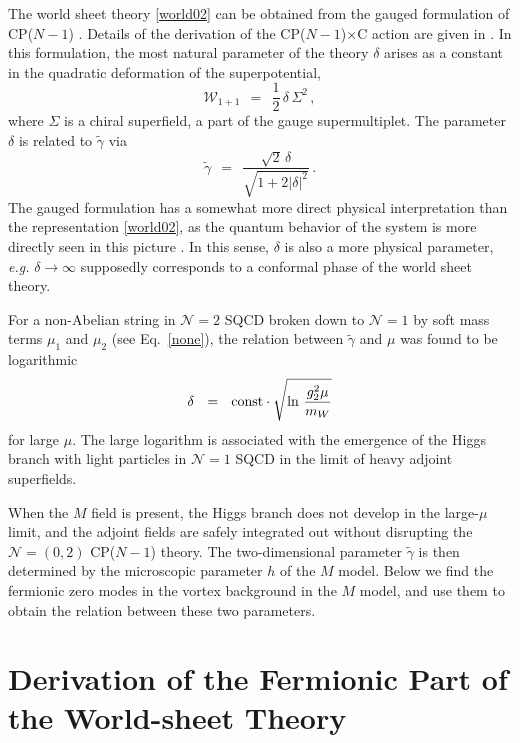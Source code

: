 \documentclass[12pt]{article}
\def\beq{\begin{equation}}
\def\eeq{\end{equation}}
\newcommand{\ntwo}{${\mathcal N}=2$ }
\newcommand{\ntwoo}{${\mathcal N}= \left(0,2\right) $ }
\newcommand{\none}{${\mathcal N}=1$ }
\newcommand{\wt}{\widetilde}
\newcommand{\CPC}{CP($N-1$)$\times$C }
\newcommand{\tgamma}{\wt{\gamma}}
\begin{document}
	The world sheet theory \eqref{world02} can be obtained from the gauged formulation of CP($N-1$) \cite{W93}.
	Details of the derivation of the \CPC action are given in \cite{SYhet,BSYhet}.
	In this formulation, the most natural parameter of the theory $\delta$ arises as 
	a constant in the quadratic deformation of the superpotential,
\[
	\mathcal{W}_{1+1} ~~=~~ \frac{1}{2}\,\delta\,\Sigma^2\,,
\]
	where $\Sigma$ is a chiral superfield, a part of the gauge supermultiplet.
The parameter $ \delta $ is related to $ \tgamma $ via
\[
	\tgamma ~~=~~ \frac { \sqrt{2}\,\delta } { \sqrt{ 1 +  2 |\delta|^2 } }\,.
\]
	The gauged formulation has a somewhat more direct physical interpretation than
	the representation \eqref{world02}, as the quantum behavior of the system is more directly
	seen in this picture \cite{SYhet2}. 
	In this sense, $ \delta $ is also a more physical parameter, {\it e.g.}
	$ \delta \to \infty $ supposedly corresponds to a conformal phase of the world sheet theory.

	For a non-Abelian string in \ntwo SQCD broken down to \none by soft mass terms $ \mu_1 $ and $ \mu_2 $
	(see Eq.~\eqref{none}), the relation between $ \tgamma $ and $ \mu $ was found to be logarithmic \cite{SYhet,BSYhet}
\beq
	\delta ~~=~~ 
	{\rm const} \cdot \sqrt{\ln\, \frac{g_2^2\mu}{m_W}}
\eeq
	for large $ \mu $.
	The large logarithm is associated with the emergence  of the Higgs branch
	with light particles in \none SQCD in the limit of heavy  adjoint superfields.
	

	When the $ M $ field is present, the Higgs branch does not develop in the large-$ \mu $
	limit, and the adjoint
	fields are safely integrated out without disrupting the \ntwoo CP($N-1$) theory.
	The two-dimensional parameter $ \tgamma $ is then determined by the microscopic parameter $ h $ of the  $ M $ model. 
	Below we find the fermionic zero modes in the vortex background in the $M$ model,
	and use them to obtain the relation between these two parameters. 
	
%
%
\section{Derivation of the Fermionic Part of the World-sheet Theory}
\setcounter{equation}{0}
\end{document}
